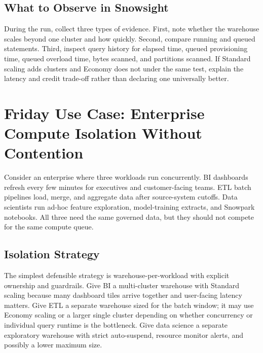 \subsection{What to Observe in Snowsight}
During the run, collect three types of evidence. First, note whether the warehouse scales beyond one cluster and how quickly. Second, compare running and queued statements. Third, inspect query history for elapsed time, queued provisioning time, queued overload time, bytes scanned, and partitions scanned. If Standard scaling adds clusters and Economy does not under the same test, explain the latency and credit trade-off rather than declaring one universally better.

\section{Friday Use Case: Enterprise Compute Isolation Without Contention}
Consider an enterprise where three workloads run concurrently. BI dashboards refresh every few minutes for executives and customer-facing teams. ETL batch pipelines load, merge, and aggregate data after source-system cutoffs. Data scientists run ad-hoc feature exploration, model-training extracts, and Snowpark notebooks. All three need the same governed data, but they should not compete for the same compute queue.

\subsection{Isolation Strategy}
The simplest defensible strategy is warehouse-per-workload with explicit ownership and guardrails. Give BI a multi-cluster warehouse with Standard scaling because many dashboard tiles arrive together and user-facing latency matters. Give ETL a separate warehouse sized for the batch window; it may use Economy scaling or a larger single cluster depending on whether concurrency or individual query runtime is the bottleneck. Give data science a separate exploratory warehouse with strict auto-suspend, resource monitor alerts, and possibly a lower maximum size.

